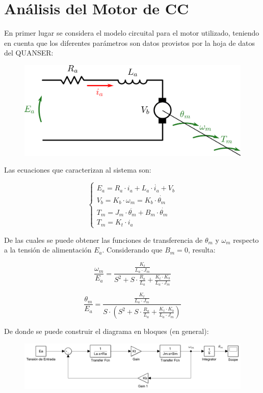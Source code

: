 \documentclass{article}
\begin{document}



\tableofcontents
\newpage

\section{Análisis del Motor de CC}

En primer lugar se considera el modelo circuital para el motor utilizado, teniendo en cuenta que los diferentes parámetros son datos provistos por la hoja de datos del QUANSER:

\begin{figure}[H]
\centering
\includegraphics[width=0.5\linewidth]{../Images/ModeloMotor.png}
\end{figure}

Las ecuaciones que caracterizan al sistema son:

\[
\left\lbrace
\begin{array}{ll}
E_a = R_a \cdot i_a + L_a \cdot \dot{i_a} + V_b \\
V_b = K_b \cdot \omega_m = K_b \cdot \dot{\theta_m} \\
T_m = J_m \cdot \ddot{\theta_m} + B_m \cdot \dot{\theta_m} \\
T_m = K_t \cdot i_a
\end{array}
\right.
\]

De las cuales se puede obtener las funciones de transferencia de $\theta_m$ y $\omega_m$ respecto a la tensión de alimentación $E_a$. Considerando que $B_m = 0$, resulta:

\[
\frac{\omega_m}{E_a} = \frac{\frac{K_t}{L_a \cdot J_m}}{S^2 + S\cdot \frac{R_a}{L_a} + \frac{K_t \cdot K_b}{L_a \cdot J_m}}
\]

\[
\frac{\theta_m}{E_a} = \frac{\frac{K_t}{L_a \cdot J_m}}{S\cdot \left(S^2 + S \cdot \frac{R_a}{L_a} + \frac{K_t \cdot K_b}{L_a \cdot J_m}\right)}
\]

De donde se puede construir el diagrama en bloques (en general): 

\begin{figure}[H]
\centering
\includegraphics[width=1\linewidth]{../Images/DiagramaSimple.png}
\end{figure}
\end{document}
